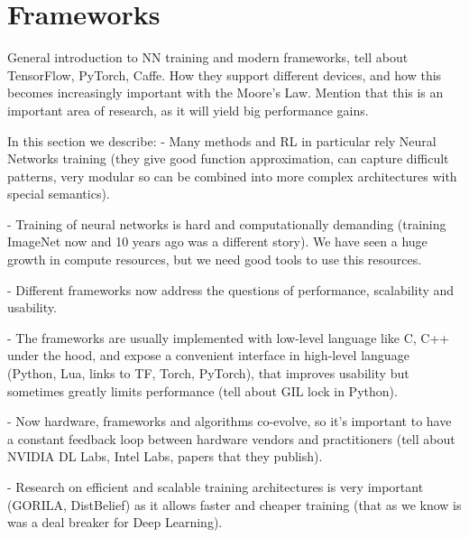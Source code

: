 \section{Frameworks}

General introduction to NN training and modern frameworks, tell about
TensorFlow, PyTorch, Caffe. How they support different devices, and how
this becomes increasingly important with the Moore's Law. Mention that this
is an important area of research, as it will yield big performance gains.

In this section we describe:
- Many methods and RL in particular rely Neural Networks training (they give good function approximation, can capture
difficult patterns, very modular so can be combined into more complex architectures with special semantics).

- Training of neural networks is hard and computationally demanding (training ImageNet now and 10 years ago was a different story). We have seen a huge growth in compute resources, but we need good tools to use this resources.

- Different frameworks now address the questions of performance, scalability and usability.

- The frameworks are usually implemented with low-level language like C, C++ under the hood, and expose
a convenient interface in high-level language (Python, Lua, links to TF, Torch, PyTorch),
that improves usability but sometimes greatly limits performance (tell about GIL lock in Python).

- Now hardware, frameworks and algorithms co-evolve, so it's important to have a constant feedback loop between
hardware vendors and practitioners (tell about NVIDIA DL Labs, Intel Labs, papers that they publish).

- Research on efficient and scalable training architectures is very important (GORILA, DistBelief) as it
allows faster and cheaper training (that as we know is was a deal breaker for Deep Learning).

